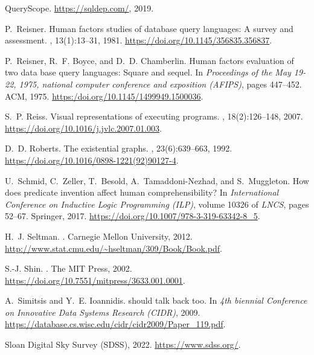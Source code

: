 \documentclass[letterpaper,11pt]{article}
\begin{document}
\begin{thebibliography}{100}
{QueryScope}.
\newblock \url{https://sqldep.com/}, 2019.

P.~Reisner.
\newblock Human factors studies of database query languages: A survey and
  assessment.
, 13(1):13--31, 1981.
\newblock \url{https://doi.org/10.1145/356835.356837}.

P.~Reisner, R.~F. Boyce, and D.~D. Chamberlin.
\newblock Human factors evaluation of two data base query languages: Square and
  sequel.
\newblock In {\em Proceedings of the May 19-22, 1975, national computer
  conference and exposition (AFIPS)}, pages 447--452. ACM, 1975.
\newblock \url{https:/doi.org/10.1145/1499949.1500036}.

S.~P. Reiss.
\newblock Visual representations of executing programs.
, 18(2):126--148, 2007.
\newblock \url{https://doi.org/10.1016/j.jvlc.2007.01.003}.

D.~D. Roberts.
\newblock The existential graphs.
, 23(6):639--663,
  1992.
\newblock \url{https://doi.org/10.1016/0898-1221(92)90127-4}.

U.~Schmid, C.~Zeller, T.~Besold, A.~Tamaddoni-Nezhad, and S.~Muggleton.
\newblock How does predicate invention affect human comprehensibility?
\newblock In {\em International Conference on Inductive Logic Programming
  (ILP)}, volume 10326 of {\em LNCS}, pages 52--67. Springer, 2017.
\newblock \url{https://doi.org/10.1007/978-3-319-63342-8_5}.

H.~J. Seltman.
.
\newblock Carnegie Mellon University, 2012.
\newblock \url{http://www.stat.cmu.edu/~hseltman/309/Book/Book.pdf}.

S.-J. Shin.
.
\newblock The MIT Press, 2002.
\newblock \url{https://doi.org/10.7551/mitpress/3633.001.0001}.

A.~Simitsis and Y.~E. Ioannidis.
 should talk back too.
\newblock In {\em 4th biennial Conference on Innovative Data Systems Research
  ({CIDR})}, 2009.
\newblock \url{https://database.cs.wisc.edu/cidr/cidr2009/Paper\_119.pdf}.

{Sloan Digital Sky Survey (SDSS)}, 2022.
\newblock \url{https://www.sdss.org/}.


\end{thebibliography}
\end{document}
